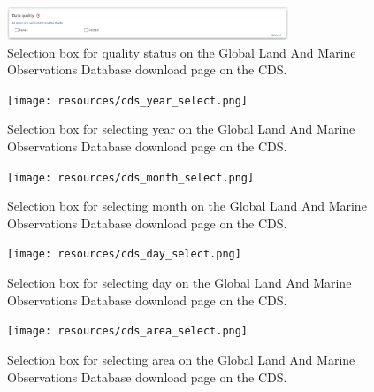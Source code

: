 \begin{figure}
\centering
\includegraphics[width=0.75\textwidth]{resources/cds_qc_select.png}
\caption{Selection box for quality status on the Global Land And Marine Observations Database download page on the CDS.\\}
\label{fig:cds_qc}
\end{figure}

\begin{figure}
\centering
\texttt{[image: resources/cds\_year\_select.png]}
\caption{Selection box for selecting year on the Global Land And Marine Observations Database download page on the CDS.\\}
\label{fig:cds_year}
\end{figure}

\begin{figure}
\centering
\texttt{[image: resources/cds\_month\_select.png]}
\caption{Selection box for selecting month on the Global Land And Marine Observations Database download page on the CDS.\\}
\label{fig:cds_month}
\end{figure}

\begin{figure}
\centering
\texttt{[image: resources/cds\_day\_select.png]}
\caption{Selection box for selecting day on the Global Land And Marine Observations Database download page on the CDS.\\}
\label{fig:cds_day}
\end{figure}

\begin{figure}
\centering
\texttt{[image: resources/cds\_area\_select.png]}
\caption{Selection box for selecting area on the Global Land And Marine Observations Database download page on the CDS.\\}
\label{fig:cds_area}
\end{figure}

